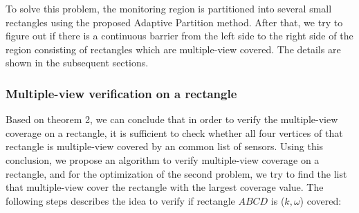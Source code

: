 To solve this problem, the monitoring region is partitioned into several small rectangles using the proposed Adaptive Partition method. After that, we try to figure out if there is a continuous barrier from the left side to the right side of the region consisting of rectangles which are multiple-view covered. The details are shown in the subsequent sections.

\subsubsection{Multiple-view verification on a rectangle}
\label{subsec:01}
Based on theorem 2, we can conclude that in order to verify the multiple-view coverage on a rectangle, it is sufficient to check whether all four vertices of that rectangle is multiple-view covered by an common list of sensors. Using this conclusion, we propose an algorithm to verify multiple-view coverage on a rectangle, and for the optimization of the second problem, we try to find the list that multiple-view cover the rectangle with the largest coverage value. 
The following steps describes the idea to verify if rectangle $ABCD$ is ($k,\omega$) covered:
